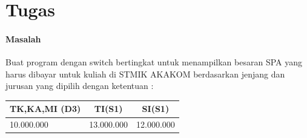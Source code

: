 \documentclass[a4paper,12pt]{article}
\begin{document}
\section{Tugas}
\paragraph{Masalah\\}
Buat program dengan switch bertingkat untuk menampilkan besaran SPA yang harus
dibayar untuk kuliah di STMIK AKAKOM berdasarkan jenjang dan jurusan yang dipilih
dengan ketentuan :
\begin{table}[!ht]
	\begin{tabular}{|l|l|l|}
		\hline
		\multicolumn{1}{|c|}{\textbf{TK,KA,MI (D3)}} & \multicolumn{1}{c|}{\textbf{TI(S1)}} & \multicolumn{1}{c|}{\textbf{SI(S1)}} \\ \hline
		10.000.000                                   & 13.000.000                           & 12.000.000                           \\ \hline
	\end{tabular}
\end{table}
\end{document}
